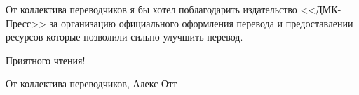 От коллектива переводчиков я бы хотел поблагодарить издательство <<ДМК-Пресс>> за
организацию официального оформления перевода и предоставлении ресурсов которые позволили
сильно улучшить перевод.

\vspace{1em}

Приятного чтения!

\begin{flushright}
  От коллектива переводчиков, Алекс Отт
\end{flushright}

